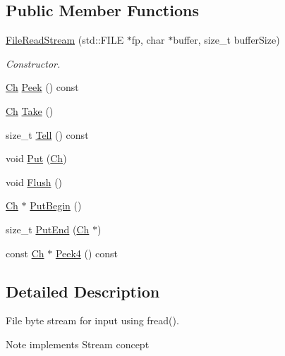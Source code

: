 \subsection*{Public Member Functions}
\begin{DoxyCompactItemize}
\item 
\hyperlink{classFileReadStream_adf91191843d50b900f43cb4f35f16f67}{File\+Read\+Stream} (std\+::\+F\+I\+LE $\ast$fp, char $\ast$buffer, size\+\_\+t buffer\+Size)
\begin{DoxyCompactList}\small\item\em Constructor. \end{DoxyCompactList}\item 
\hyperlink{classFileReadStream_ae1f83d9ca3c76d1d151af0b6c427f046}{Ch} \hyperlink{classFileReadStream_ab129c5d15343488caf60b4fee48024fb}{Peek} () const 
\item 
\hyperlink{classFileReadStream_ae1f83d9ca3c76d1d151af0b6c427f046}{Ch} \hyperlink{classFileReadStream_addcbccc9d86ccbbe6d8e876ba595dbcb}{Take} ()
\item 
size\+\_\+t \hyperlink{classFileReadStream_a9a2f09eb66ae912c4d5f472bdfdd92ce}{Tell} () const 
\item 
void \hyperlink{classFileReadStream_a4f2eac5b08033b1527bff517be657a36}{Put} (\hyperlink{classFileReadStream_ae1f83d9ca3c76d1d151af0b6c427f046}{Ch})
\item 
void \hyperlink{classFileReadStream_acd031e3f578b23bc2a792ac41e1e95ae}{Flush} ()
\item 
\hyperlink{classFileReadStream_ae1f83d9ca3c76d1d151af0b6c427f046}{Ch} $\ast$ \hyperlink{classFileReadStream_ac985850ab75f204dc08a01d12a8ef5c6}{Put\+Begin} ()
\item 
size\+\_\+t \hyperlink{classFileReadStream_a886660c89f698ff913d641d61466108f}{Put\+End} (\hyperlink{classFileReadStream_ae1f83d9ca3c76d1d151af0b6c427f046}{Ch} $\ast$)
\item 
const \hyperlink{classFileReadStream_ae1f83d9ca3c76d1d151af0b6c427f046}{Ch} $\ast$ \hyperlink{classFileReadStream_a33ebc2af3a7dea770c70e9c1d53f0f91}{Peek4} () const 
\end{DoxyCompactItemize}


\subsection{Detailed Description}
File byte stream for input using fread(). 

\begin{DoxyNote}{Note}
implements Stream concept 
\end{DoxyNote}


